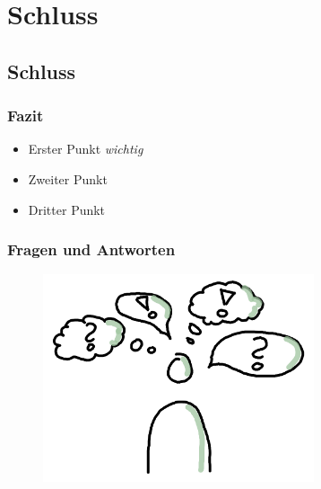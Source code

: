 \section{Schluss}

\subsection*{Schluss}

\begin{frame}
	\frametitle{Fazit}
	\begin{itemize}[<+->]
		\item Erster Punkt \emph{wichtig}
		\item Zweiter Punkt
		\item Dritter Punkt
	\end{itemize}
\end{frame}

\begin{frame}
	\frametitle{Fragen und Antworten}
	\begin{figure}[ht]
		\includegraphics[width=8.0cm]{Bilder/fragenantwort.png}
	\end{figure}
\end{frame}